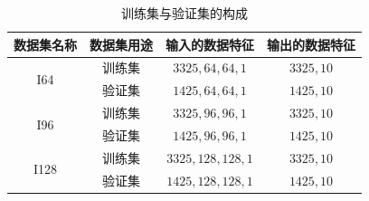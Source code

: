 \begin{table}[htbp]
\centering
\caption{训练集与验证集的构成}
\label{table:t0} 
\begin{tabular}{cccc}
\toprule[2pt] 
数据集名称 & 数据集用途 & 输入的数据特征 & 输出的数据特征 \\ 
\midrule[2pt]
\multirow{2}{*}{I64} & 训练集 & $3325,64,64,1$ & $3325,10$ \\ 
 & 验证集 & $1425,64,64,1$ & $1425,10$ \\ 
\midrule[1pt]
\multirow{2}{*}{I96} & 训练集 & $3325,96,96,1$ & $3325,10$ \\ 
 & 验证集 & $1425,96,96,1$ & $1425,10$ \\ 
\midrule[1pt]
\multirow{2}{*}{I128} & 训练集 & $3325,128,128,1$ & $3325,10$ \\ 
 & 验证集 & $1425,128,128,1$ & $1425,10$ \\ 
\bottomrule[2pt]
\end{tabular} 
\end{table}



